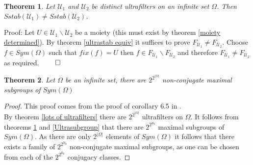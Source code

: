 \documentclass{report}
\newtheorem{theorem}{Theorem}[section]
\begin{document}
\begin{theorem} \label{distinct ultragroups}
Let $\mathcal{U}_1$ and $\mathcal{U}_2$ be distinct ultrafilters on an infinite set $\Omega$. Then $Sstab(\mathcal{U}_1) \neq Sstab(\mathcal{U}_2)$.
\end{theorem}\par
Proof: Let $U\in \mathcal{U}_1 \backslash  \mathcal{U}_2$ be a moiety (this must exist by theorem \ref{moiety determined}). By theorem \ref{ultrastab equiv} it suffices to prove $F_{\mathcal{U}_1} \neq F_{\mathcal{U}_2}$. Choose $f \in Sym(\Omega)$ such that $fix(f) = U$ then  $f \in F_{\mathcal{U}_1} \backslash  F_{\mathcal{U}_2}$ and therefore $F_{\mathcal{U}_1} \neq F_{\mathcal{U}_2}$ as required. $\qed$
\begin{theorem}
Let $\Omega$ be an infinite set, there are $2^{2^{\vert \Omega \vert}}$ non-conjugate maximal subgroups of $Sym(\Omega)$
\end{theorem}
\begin{proof}
This proof comes from the proof of corollary 6.5 in \cite{ultrafiltermax}.\\
By theorem \ref{lots of ultrafilters} there are $2^{2^{\vert \Omega \vert}}$ ultrafilters on $\Omega$. It follows from theorems \ref{distinct ultragroups} and \ref{Ultrasubgroup} that there are $2^{2^{\aleph_{0}}}$ maximal subgroups of $Sym(\Omega)$. As there are only $2^{\vert \Omega \vert}$ elements of $Sym(\Omega)$ it follows that there exists a family of $2^{2^{\aleph_{0}}}$ non-conjugate maximal subgroups, as one can be chosen from each of the $2^{2^{\aleph_{0}}}$ conjugacy classes.
\end{proof}
\end{document}
